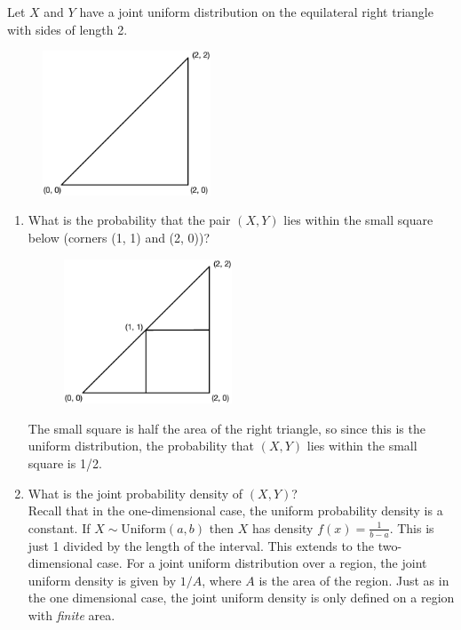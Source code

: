 \documentclass[notes.tex]{subfiles}
\begin{document}
\begin{example}Let $X$ and $Y$ have a joint uniform distribution on the equilateral right triangle with sides of length 2. 
\begin{figure}[H]
\centering
\includegraphics[width=5cm]{uniformtriangle}
\end{figure}

\begin{enumerate}
\item What is the probability that the pair $(X, Y)$ lies within the small square below (corners (1, 1) and (2, 0))?
\begin{figure}[H]
\centering
\includegraphics[width=5cm]{uniformtriangle2}
\end{figure}
The small square is half the area of the right triangle, so since this is the uniform distribution, the probability that $(X, Y)$ lies within the small square is 1/2.

\item What is the joint probability density of $(X, Y)$?\\

Recall that in the one-dimensional case, the uniform probability density is a constant. If $X \sim \text{Uniform}(a, b)$ then $X$ has density $f(x) = \frac{1}{b-a}$. This is just 1 divided by the length of the interval. This extends to the two-dimensional case. For a joint uniform distribution over a region, the joint uniform density is given by $1/A$, where $A$ is the area of the region. Just as in the one dimensional case, the joint uniform density is only defined on a region with \emph{finite} area. \\


\end{enumerate}
\end{example}
\end{document}

